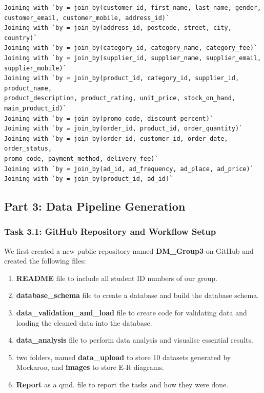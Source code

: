 \documentclass[
  letterpaper,
  DIV=11,
  numbers=noendperiod]{scrartcl}
\providecommand{\tightlist}{%
  \setlength{\itemsep}{0pt}\setlength{\parskip}{0pt}}\usepackage{longtable,booktabs,array}
\begin{document}
\begin{verbatim}
Joining with `by = join_by(customer_id, first_name, last_name, gender,
customer_email, customer_mobile, address_id)`
Joining with `by = join_by(address_id, postcode, street, city, country)`
Joining with `by = join_by(category_id, category_name, category_fee)`
Joining with `by = join_by(supplier_id, supplier_name, supplier_email,
supplier_mobile)`
Joining with `by = join_by(product_id, category_id, supplier_id, product_name,
product_description, product_rating, unit_price, stock_on_hand,
main_product_id)`
Joining with `by = join_by(promo_code, discount_percent)`
Joining with `by = join_by(order_id, product_id, order_quantity)`
Joining with `by = join_by(order_id, customer_id, order_date, order_status,
promo_code, payment_method, delivery_fee)`
Joining with `by = join_by(ad_id, ad_frequency, ad_place, ad_price)`
Joining with `by = join_by(product_id, ad_id)`
\end{verbatim}

\hypertarget{part-3-data-pipeline-generation}{%
\subsection{Part 3: Data Pipeline
Generation}\label{part-3-data-pipeline-generation}}

\hypertarget{task-3.1-github-repository-and-workflow-setup}{%
\subsubsection{Task 3.1: GitHub Repository and Workflow
Setup}\label{task-3.1-github-repository-and-workflow-setup}}

We first created a new public repository named \textbf{DM\_Group3} on
GitHub and created the following files:

\begin{enumerate}
\def\labelenumi{\arabic{enumi}.}
\tightlist
\item
  \textbf{README} file to include all student ID numbers of our group.
\item
  \textbf{database\_schema} file to create a database and build the
  database schema.
\item
  \textbf{data\_validation\_and\_load} file to create code for
  validating data and loading the cleaned data into the database.
\item
  \textbf{data\_analysis} file to perform data analysis and visualise
  essential results.
\item
  two folders, named \textbf{data\_upload} to store 10 datasets
  generated by Mockaroo, and \textbf{images} to store E-R diagrams.
\item
  \textbf{Report} as a qmd. file to report the tasks and how they were
  done.
\end{enumerate}
\end{document}
